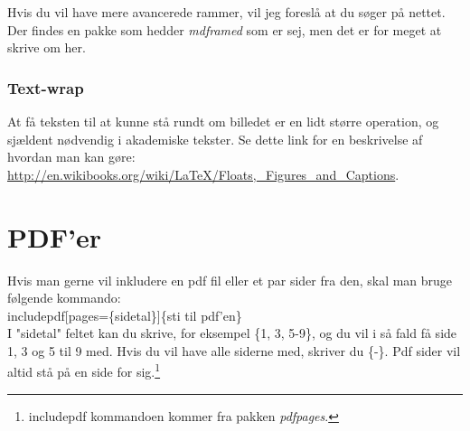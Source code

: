\noindent
Hvis du vil have mere avancerede rammer, vil jeg foreslå at du søger på nettet. Der findes en pakke som hedder \emph{mdframed} som er sej, men det er for meget at skrive om her.

\subsubsection{Text-wrap}
At få teksten til at kunne stå rundt om billedet er en lidt større operation, og sjældent nødvendig i akademiske tekster. Se dette link for en beskrivelse af hvordan man kan gøre: \url{http://en.wikibooks.org/wiki/LaTeX/Floats,_Figures_and_Captions}.

\section{PDF'er}
Hvis man gerne vil inkludere en pdf fil eller et par sider fra den, skal man bruge følgende kommando:\\

\indent \bs includepdf[pages=\{sidetal\}]\{sti til pdf'en\}\\

\noindent
I "sidetal" feltet kan du skrive, for eksempel \{1, 3, 5-9\}, og du vil i så fald få side 1, 3 og 5 til 9 med. Hvis du vil have alle siderne med, skriver du \{-\}. Pdf sider vil altid stå på en side for sig.\footnote{\bs includepdf kommandoen kommer fra pakken \emph{pdfpages}.}
